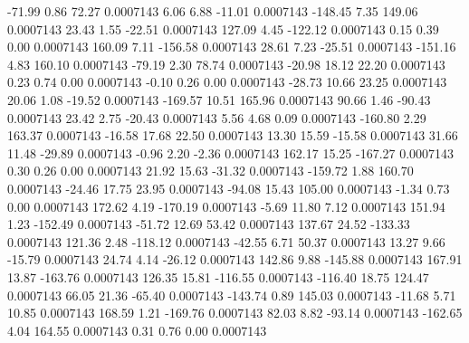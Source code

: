       -71.99        0.86       72.27     0.0007143
        6.06        6.88      -11.01     0.0007143
     -148.45        7.35      149.06     0.0007143
       23.43        1.55      -22.51     0.0007143
      127.09        4.45     -122.12     0.0007143
        0.15        0.39        0.00     0.0007143
      160.09        7.11     -156.58     0.0007143
       28.61        7.23      -25.51     0.0007143
     -151.16        4.83      160.10     0.0007143
      -79.19        2.30       78.74     0.0007143
      -20.98       18.12       22.20     0.0007143
        0.23        0.74        0.00     0.0007143
       -0.10        0.26        0.00     0.0007143
      -28.73       10.66       23.25     0.0007143
       20.06        1.08      -19.52     0.0007143
     -169.57       10.51      165.96     0.0007143
       90.66        1.46      -90.43     0.0007143
       23.42        2.75      -20.43     0.0007143
        5.56        4.68        0.09     0.0007143
     -160.80        2.29      163.37     0.0007143
      -16.58       17.68       22.50     0.0007143
       13.30       15.59      -15.58     0.0007143
       31.66       11.48      -29.89     0.0007143
       -0.96        2.20       -2.36     0.0007143
      162.17       15.25     -167.27     0.0007143
        0.30        0.26        0.00     0.0007143
       21.92       15.63      -31.32     0.0007143
     -159.72        1.88      160.70     0.0007143
      -24.46       17.75       23.95     0.0007143
      -94.08       15.43      105.00     0.0007143
       -1.34        0.73        0.00     0.0007143
      172.62        4.19     -170.19     0.0007143
       -5.69       11.80        7.12     0.0007143
      151.94        1.23     -152.49     0.0007143
      -51.72       12.69       53.42     0.0007143
      137.67       24.52     -133.33     0.0007143
      121.36        2.48     -118.12     0.0007143
      -42.55        6.71       50.37     0.0007143
       13.27        9.66      -15.79     0.0007143
       24.74        4.14      -26.12     0.0007143
      142.86        9.88     -145.88     0.0007143
      167.91       13.87     -163.76     0.0007143
      126.35       15.81     -116.55     0.0007143
     -116.40       18.75      124.47     0.0007143
       66.05       21.36      -65.40     0.0007143
     -143.74        0.89      145.03     0.0007143
      -11.68        5.71       10.85     0.0007143
      168.59        1.21     -169.76     0.0007143
       82.03        8.82      -93.14     0.0007143
     -162.65        4.04      164.55     0.0007143
        0.31        0.76        0.00     0.0007143
